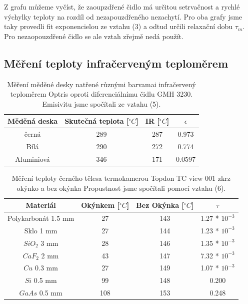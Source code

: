 \documentclass[a4paper,11pt]{article}
\begin{document}
Z grafu můžeme vyčíst, že zaoupzdřené čidlo má určitou setrvačnost a 
rychlé výchylky teploty na rozdíl od nezapouzdřeného nezachytí. 
Pro oba grafy jsme taky provedli fit exponencielou ze vztahu (3) a odtud určili relaxační dobu $\tau_m$. 
Pro nezaopouzdřené čidlo se ale vztah zřejmě nedá použít.

\newpage

\subsection{Měření teploty infračerveným teploměrem}

\begin{table}[ht]
  \centering
  \begin{tabular}{ | c | c | c | c | }
    \hline
    Měděná deska & Skutečná teplota [$^{\circ} C$] & IR [$^{\circ} C$] & $\epsilon$ \\ \hline
    černá & 289 & 287 & 0.973 \\
    Bílá & 290 & 272 & 0.774 \\
    Aluminiová & 346 & 171 & 0.0597\\ \hline
  \end{tabular}
  \captionsetup{justification=centering}
  \caption{Měření měděné desky natřené různými barvamai infračervený teploměrem Optris oproti diferenciálnímu čidlu GMH 3230. 
  Emisivitu jsme spočítali ze vztahu (5).}
\end{table}

\begin{table}[ht]
  \centering
  \begin{tabular}{| c | c | c | c | }
    \hline
    Materiál & Okýnkem [$^{\circ} C$] & Bez Okýnka [$^{\circ} C$] & $\tau$ \\ \hline
    Polykarbonát 1.5 mm & 27 & 143 & 1.27 * $10^{-3}$ \\
    Sklo 1 mm & 27 & 144 & 1.23 * $10^{-3}$ \\ 
    $SiO_2$ 3 mm & 28 & 146 & 1.35 * $10^{-3}$ \\ 
    $CaF_2$ 2 mm & 43 & 147 & 7.32 * $10^{-3}$ \\ 
    $Cu$ 0.3 mm & 27 & 149 &   1.07 * $10^{-3}$ \\ 
    $Si$ 0.5 mm & 99 & 148 & 0.200 \\ 
    $GaAs$ 0.5 mm & 108 & 153 & 0.248 \\ \hline
  \end{tabular}
  \captionsetup{justification=centering}
  \caption{Měření teploty černého tělesa termokamerou Topdon TC view 001 zkrz okýnko a bez okýnka
    Propustnost jsme spočítali pomocí vztahu (6).}
\end{table}
\end{document}
